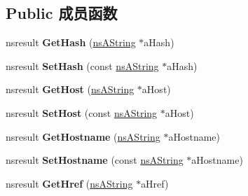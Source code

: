 \subsection*{Public 成员函数}
\begin{DoxyCompactItemize}
\item 
\mbox{\label{interfacens_i_d_o_m_location_a3e7c519b42bbdba901fe55eead1c4f79}} 
nsresult {\bfseries Get\+Hash} (\hyperlink{structns_string_container}{ns\+A\+String} $\ast$a\+Hash)
\item 
\mbox{\label{interfacens_i_d_o_m_location_a30f85e90ea3716228d897d11593ac3f6}} 
nsresult {\bfseries Set\+Hash} (const \hyperlink{structns_string_container}{ns\+A\+String} $\ast$a\+Hash)
\item 
\mbox{\label{interfacens_i_d_o_m_location_a16e6d433bba145ff8c86ab72c3008c49}} 
nsresult {\bfseries Get\+Host} (\hyperlink{structns_string_container}{ns\+A\+String} $\ast$a\+Host)
\item 
\mbox{\label{interfacens_i_d_o_m_location_ae97ccd5262d63ffa1314097a7172e8ab}} 
nsresult {\bfseries Set\+Host} (const \hyperlink{structns_string_container}{ns\+A\+String} $\ast$a\+Host)
\item 
\mbox{\label{interfacens_i_d_o_m_location_a83001ed2ce95f672d6d30012eabfe0e3}} 
nsresult {\bfseries Get\+Hostname} (\hyperlink{structns_string_container}{ns\+A\+String} $\ast$a\+Hostname)
\item 
\mbox{\label{interfacens_i_d_o_m_location_ab3a563e0554f27ccbdda2ba80ae6aa97}} 
nsresult {\bfseries Set\+Hostname} (const \hyperlink{structns_string_container}{ns\+A\+String} $\ast$a\+Hostname)
\item 
\mbox{\label{interfacens_i_d_o_m_location_aa267c32b9e88daaeb7ca3b0e882c4e85}} 
nsresult {\bfseries Get\+Href} (\hyperlink{structns_string_container}{ns\+A\+String} $\ast$a\+Href)
\item 
\mbox{\label{interfacens_i_d_o_m_location_a70636872c3d8799c154bdc625de5a55f}} 

\end{DoxyCompactItemize}
